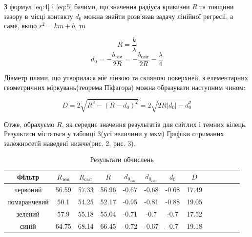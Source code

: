 З формул \ref{eq:4} і \ref{eq:5} бачимо, що значення радіуса 
кривизни $R$ та товщини зазору в місці контакту $d_0$ можна знайти 
розв'язав задачу лінійної регресіі, а саме, якщо $r^2 = k m + b$, то

$$ R = \frac{k}{\lambda} $$
$$ d_0 = - \frac{b_{тем}}{2R} = - \frac{b_{світ}}{2R} - \frac{\lambda}{4} $$

Діаметр плями, що утворилася міє лінзою та скляною поверхней, з елементарних
геометричних міркувань(теорема Піфагора) можна образувати наступним чином:

$$ D = 2 \sqrt{R^2 - (R-d_0)^2} = 2 \sqrt{2R|d_0| - d_0^2} $$

Отже, обрахуємо $R$, як середнє значення результатів для світлих і темних 
кілець. Результати містяться у таблиці 3(усі величини у мкм) Графіки отриманих залежносетй наведені нижче(рис. 2, рис. 3).

\begin{table}[h]
    \centering
    \begin{tabular}{|c|c|c|c|c|c|c|c|c|c|c|c|c|}
        \hline
        \textbf{Фільтр} & \textbf{$R_{тем}$} & \textbf{$R_{світ}$} & \textbf{$R$} &
        \textbf{$d_{0_{тем}}$} & \textbf{$d_{0_{світ}}$} & \textbf{$d_0$} & \textbf{$D$} \\
        \hline

        червоний & 56.59 & 57.33 & 56.96 & -0.67 & -0.68 & -0.68 & 17.49 \\
        \hline
        
        помаранчевий & 50.1 & 54.25 & 52.17 & -0.95 & -0.81 & -0.88 & 19.05 \\
        \hline
        
        зелений & 57.9 & 55.18 & 55.04 & -0.71 & -0.7 & -0.7 & 17.52 \\
        \hline

        синій & 64.75 & 68.14 & 66.45 & -0.72 & -0.67 & -0.7 & 19.18 \\
        \hline

    \end{tabular}
    \caption{Результати обчислень}
\end{table}



